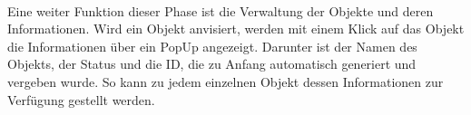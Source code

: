 \\
Eine weiter Funktion dieser Phase ist die Verwaltung der Objekte und deren Informationen. Wird ein Objekt anvisiert, werden mit einem Klick auf das Objekt 
die Informationen über ein PopUp angezeigt. Darunter ist der Namen des Objekts, der Status und die ID, die zu Anfang automatisch generiert 
und vergeben wurde. So kann zu jedem einzelnen Objekt dessen Informationen zur Verfügung gestellt werden. 
\begin{figure}[hbt!]
    \centering

\end{figure}
